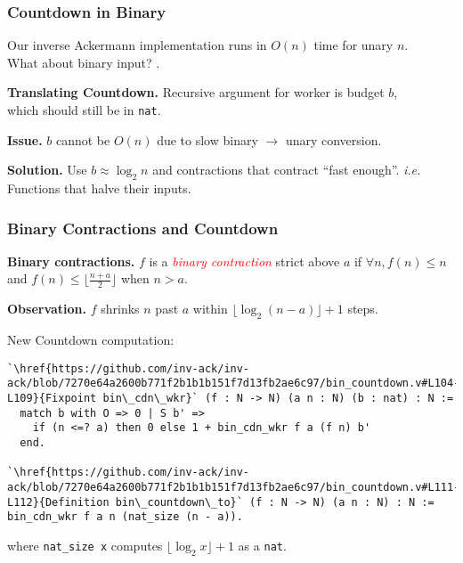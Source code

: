 \begin{frame}[fragile]
\frametitle{Countdown in Binary}

Our inverse Ackermann implementation runs in $O(n)$ time for unary $n$. \\
What about binary input? .

\bigskip
\pause 
\textbf{Translating Countdown.} Recursive argument for worker is budget $b$, \\which should still be in \texttt{nat}.

\bigskip

\textbf{Issue.} $b$ cannot be $O(n)$ due to slow binary $\rightarrow$ unary conversion.

\bigskip

\pause 
\textbf{Solution.} Use $b \approx \log_2n$ and contractions that contract ``fast enough''. 
\emph{i.e.} Functions that halve their inputs.
\end{frame}



\begin{frame}[fragile]
\frametitle{Binary Contractions and Countdown}

\textbf{Binary contractions.} $f$ is a \textcolor{red}{\emph{binary contraction}} strict above $a$ if $\forall n, f(n)\le n$ and $f(n)\le \lfloor \frac{n+ a}{2} \rfloor$ when $n > a$.

\smallskip

\textbf{Observation.} $f$ shrinks $n$ past $a$ within $\lfloor\log_2(n - a) \rfloor + 1$ steps.

\bigskip

\pause 
New Countdown computation:
\begin{lstlisting}
`\href{https://github.com/inv-ack/inv-ack/blob/7270e64a2600b771f2b1b1b151f7d13fb2ae6c97/bin_countdown.v#L104-L109}{Fixpoint bin\_cdn\_wkr}` (f : N -> N) (a n : N) (b : nat) : N :=
  match b with O => 0 | S b' =>
    if (n <=? a) then 0 else 1 + bin_cdn_wkr f a (f n) b'
  end.

`\href{https://github.com/inv-ack/inv-ack/blob/7270e64a2600b771f2b1b1b151f7d13fb2ae6c97/bin_countdown.v#L111-L112}{Definition bin\_countdown\_to}` (f : N -> N) (a n : N) : N :=
bin_cdn_wkr f a n (nat_size (n - a)).
\end{lstlisting}

where \texttt{nat\_size x} computes $\lfloor \log_2x \rfloor + 1$ as a \texttt{nat}.
 
\end{frame}


